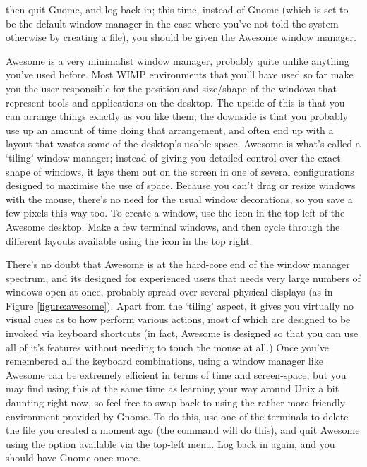 then quit Gnome, and log back in; this time, instead of Gnome (which is set to be the default window manager in the case where you've not told the system otherwise by creating a  file), you should be given the Awesome window manager.

Awesome is a very minimalist window manager, probably quite unlike anything you've used before. Most WIMP environments that you'll have used so far make you the user responsible for the position and size/shape of the windows that represent tools and applications on the desktop. The upside of this is that you can arrange things exactly as you like them; the downside is that you probably use up an amount of time doing that arrangement, and often end up with a layout that wastes some of the desktop's usable space. Awesome is what's called a `tiling' window manager; instead of giving you detailed control over the exact shape of windows, it lays them out on the screen in one of several configurations designed to maximise the use of space. Because you can't drag or resize windows with the mouse, there's no need for the usual window decorations, so you save a few pixels this way too. To create a window, use the icon in the top-left of the Awesome desktop. Make a few terminal windows, and then cycle through the different layouts available using the icon in the top right. 

There's no doubt that Awesome is at the hard-core end of the window manager spectrum, and its designed for experienced users that needs very large numbers of windows open at once, probably spread over several physical displays (as in Figure \ref{figure:awesome}). Apart from the `tiling' aspect, it gives you virtually no visual cues as to how perform various actions, most of which are designed to be invoked via keyboard shortcuts (in fact, Awesome is designed so that you can use all of it's features without needing to touch the mouse at all.) Once you've remembered all the keyboard combinations, using a window manager like Awesome can be extremely efficient in terms of time and screen-space, but you may find using this at the same time as learning your way around Unix a bit daunting right now, so feel free to swap back to using the rather more friendly environment provided by Gnome. To do this, use one of the terminals to delete the  file you created a moment ago (the command  will do this), and quit Awesome using the option available via the top-left menu. Log back in again, and you should have Gnome once more. 


